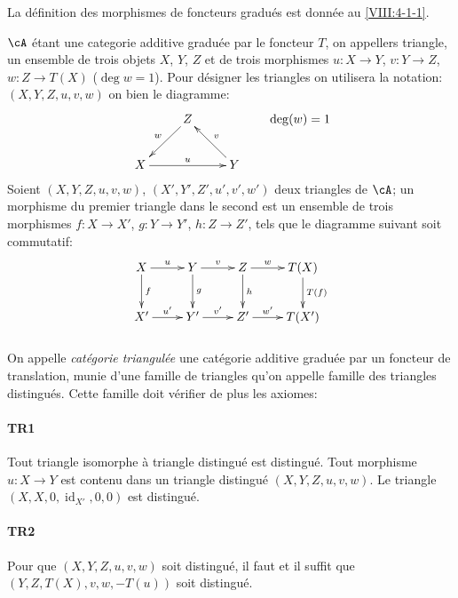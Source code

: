 La définition des morphismes de foncteurs gradués est donnée au 
\ref{VIII:4-1-1}. 

$\cA$ étant une categorie additive graduée par le foncteur $T$, on 
appellers triangle, un ensemble de trois objets $X$, $Y$, $Z$ et de trois 
morphismes $u:X\to Y$, $v:Y\to Z$, $w:Z\to T(X)$ ($\deg w=1$). Pour désigner 
les triangles on utilisera la notation: $(X,Y,Z,u,v,w)$ on bien le diagramme: 
\[\xymatrix{
  & Z \ar[dl]_-w \\
  X \ar[rr]^-u 
    & & Y \ar[lu]_-v 
}\qquad \deg(w)=1
\]
Soient $(X,Y,Z,u,v,w)$, $(X',Y',Z',u',v',w')$ deux triangles de $\cA$; un 
morphisme du premier triangle dans le second est un ensemble de trois 
morphismes $f:X\to X'$, $g:Y\to Y'$, $h:Z\to Z'$, tels que le diagramme 
suivant soit commutatif: 
\[\xymatrix{
  X \ar[r]^-u \ar[d]^-f 
    & Y \ar[r]^-v \ar[d]^-g 
    & Z \ar[r]^-w \ar[d]^-h 
    & T(X) \ar[d]^-{T(f)} \\
  X' \ar[r]^-{u'} 
    & Y' \ar[r]^-{v'} 
    & Z' \ar[r]^-{w'} 
    & T(X') 
}\]





\subsubsection{}\label{VIII:1-1-1}

On appelle \emph{catégorie triangulée} une catégorie additive graduée 
par un foncteur de translation, munie d'une famille de triangles qu'on appelle 
famille des triangles distingués. Cette famille doit vérifier de plus les 
axiomes: 


\paragraph{TR1}
\hypertarget{VIII:TR1}{}

Tout triangle isomorphe à triangle distingué est distingué. Tout 
morphisme $u:X\to Y$ est contenu dans un triangle distingué 
$(X,Y,Z,u,v,w)$. Le triangle $(X,X,0,\operatorname{id}_{X'},0,0)$ est 
distingué. 


\paragraph{TR2}
\hypertarget{VIII:TR2}{}

Pour que $(X,Y,Z,u,v,w)$ soit distingué, il faut et il suffit que 
$(Y,Z,T(X),v,w,-T(u))$ soit distingué. 


